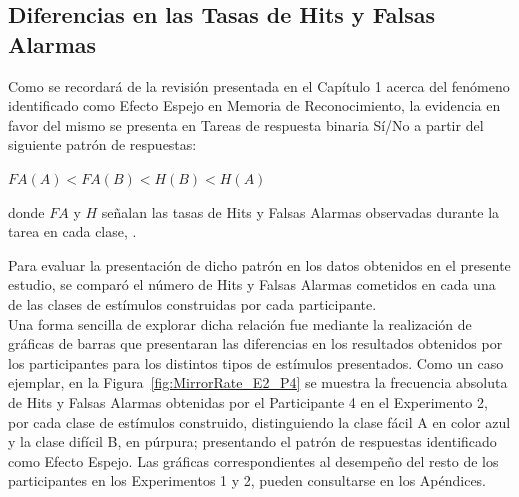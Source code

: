 \subsection{Diferencias en las Tasas de Hits y Falsas Alarmas}

Como se recordará de la revisión presentada en el Capítulo 1 acerca del fenómeno identificado como Efecto Espejo en Memoria de Reconocimiento, la evidencia en favor del mismo se presenta en Tareas de respuesta binaria Sí/No a partir del siguiente patrón de respuestas:\\
 
\begin{center}
$FA(A) < FA(B) < H(B) < H(A)$\\
\end{center}
\begin{center}
donde $FA$ y $H$ señalan las tasas de Hits y Falsas Alarmas observadas durante la tarea en cada clase, \parencite{Glanzer1993}.\\
\end{center}

Para evaluar la presentación de dicho patrón en los datos obtenidos en el presente estudio, se comparó el número de Hits y Falsas Alarmas cometidos en cada una de las clases de estímulos construidas por cada participante.\\

Una forma sencilla de explorar dicha relación fue mediante la realización de gráficas de barras que presentaran las diferencias en los resultados obtenidos por los participantes para los distintos tipos de estímulos presentados. Como un caso ejemplar, en la Figura~\ref{fig:MirrorRate_E2_P4} se muestra la frecuencia absoluta de Hits y Falsas Alarmas obtenidas por el Participante 4 en el Experimento 2, por cada clase de estímulos construido, distinguiendo la clase fácil A en color azul y la clase difícil B, en púrpura; presentando el patrón de respuestas identificado como Efecto Espejo. Las gráficas correspondientes al desempeño del resto de los participantes en los Experimentos 1 y 2, pueden consultarse en los Apéndices.\\
\\

